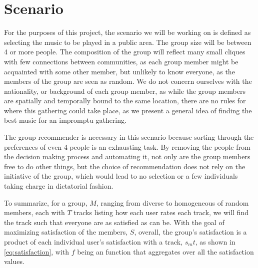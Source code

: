 \section{Scenario}

For the purposes of this project, the scenario we will be working on is defined as selecting the music to be played in a public area. The group size will be between 4 or more people. The composition of the group will reflect many small cliques with few connections between communities, as each group member might be acquainted with some other member, but unlikely to know everyone, as the members of the group are seen as random. We do not concern ourselves with the nationality, or background of each group member, as while the group members are spatially and temporally bound to the same location, there are no rules for where this gathering could take place, as we present a general idea of finding the best music for an impromptu gathering.

The group recommender is necessary in this scenario because sorting through the preferences of even 4 people is an exhausting task. By removing the people from the decision making process and automating it, not only are the group members free to do other things, but the choice of recommendation does not rely on the initiative of the group, which would lead to no selection or a few individuals taking charge in dictatorial fashion.

To summarize, for a group, $M$, ranging from diverse to homogeneous of random members, each with $T$ tracks listing how each user rates each track, we will find the track such that everyone are as satisfied as can be. With the goal of maximizing satisfaction of the members, $S$, overall, the group's satisfaction is a product of each individual user's satisfaction with a track, $s_mt$, as shown in \ref{eq:satisfaction}, with $f$ being an function that aggregates over all the satisfaction values.


